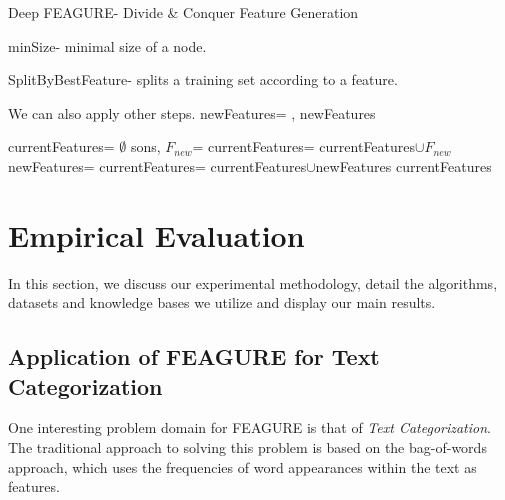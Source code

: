 \documentclass{article}
\theoremstyle{definition}
\begin{document}
\begin{algorithm}[H]
	\caption{Deep FEAGURE- Divide \& Conquer Feature Generation}
	\label{code-tree-thing}
	\small
	minSize- minimal size of a node.
	
	SplitByBestFeature- splits a training set according to a feature.
	
	\begin{algorithmic}
		 \Comment We can also apply other steps.
		\State
		\Return 
		\EndIf
		\State newFeatures=
		\State \Return {}, newFeatures
		\EndFunction
		
		
		\State 
		\State currentFeatures= $\emptyset$
		\State sons, $F_{new}$=
		\State currentFeatures= currentFeatures$\cup F_{new}$
		\State newFeatures=
		\State currentFeatures= currentFeatures$\cup$newFeatures
		\EndFor
		\State \Return currentFeatures
		\EndFunction
	\end{algorithmic}
\end{algorithm}


\section{Empirical Evaluation}
In this section, we discuss our experimental methodology, detail the algorithms, datasets and knowledge bases we utilize and display our main results.

\subsection{Application of FEAGURE for Text Categorization} \label{text-feagure}

One interesting problem domain for FEAGURE is that of \emph{Text Categorization}.
The traditional approach to solving this problem is based on the bag-of-words \citep{Wu:1981:CST:1013228.511759} approach, which uses the frequencies of word appearances within the text as features. 
\end{document}
